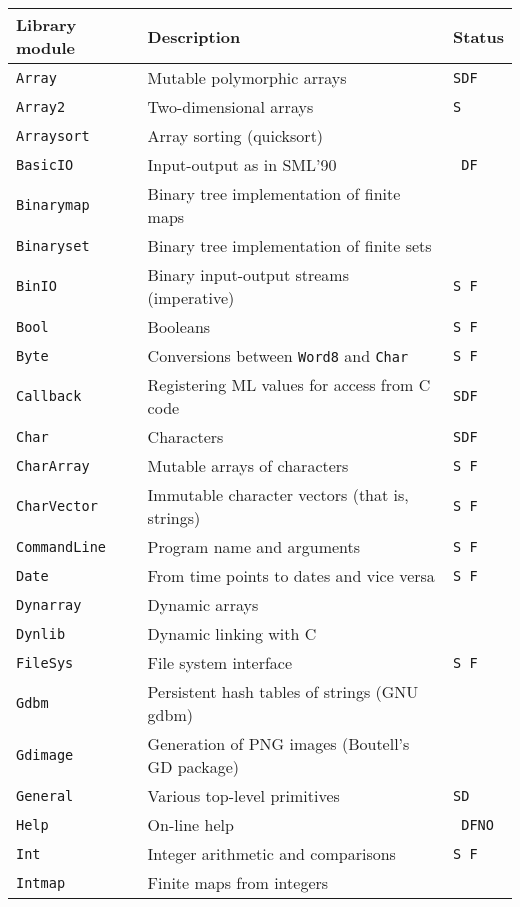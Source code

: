 \documentclass[fleqn,a4paper]{article}
\begin{document}
\begin{center}\small\renewcommand{\arraystretch}{0.9}
\begin{tabular}{@{}|lll|}\hline
Library module & Description & Status\\\hline
{\tt Array}  & Mutable polymorphic arrays & {\tt SDF}\\
{\tt Array2} & Two-dimensional arrays & {\tt S }\\
{\tt Arraysort} &  Array sorting (quicksort) & \\
{\tt BasicIO} &  Input-output as in SML'90 & {\tt \ DF}\\
{\tt Binarymap} &  Binary tree implementation of finite maps &\\
{\tt Binaryset} &  Binary tree implementation of finite sets &\\
{\tt BinIO}  & Binary input-output streams (imperative) & {\tt S F}\\
{\tt Bool}  & Booleans & {\tt S F}\\
{\tt Byte}  &  Conversions between {\tt Word8} and {\tt Char} & {\tt S F}\\
{\tt Callback}  &  Registering ML values for access from C code & {\tt SDF}\\
{\tt Char}  &  Characters & {\tt SDF}\\
{\tt CharArray} & Mutable arrays of characters & {\tt S F}\\
{\tt CharVector} & Immutable character vectors (that is, strings) & {\tt S F}\\
{\tt CommandLine} & Program name and arguments & {\tt S F}\\
{\tt Date}   & From time points to dates and vice versa& {\tt S F}\\
{\tt Dynarray} & Dynamic arrays & \\
{\tt Dynlib}  & Dynamic linking with C & \\
{\tt FileSys} & File system interface & {\tt S F}\\
{\tt Gdbm}    & Persistent hash tables of strings (GNU gdbm) & \\
{\tt Gdimage} & Generation of PNG images (Boutell's GD package) & \\
{\tt General} & Various top-level primitives & {\tt SD}\\
{\tt Help} & On-line help & {\tt \ DFNO}\\
{\tt Int} & Integer arithmetic and comparisons & {\tt S F}\\
{\tt Intmap} & Finite maps from integers & \\

\end{tabular}
\end{center}
\end{document}
